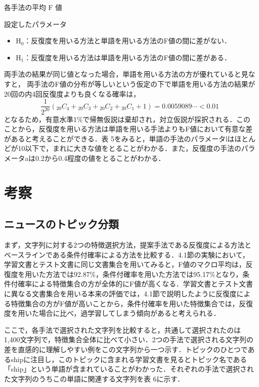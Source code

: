 \documentclass[japanese]{jnlp_1.4}
\begin{document}
\begin{table}[t]
\caption{各手法の平均 F 値}

\end{table}
\begin{table}[t]
\caption{設定したパラメータ}

\vspace{-0.5\baselineskip}
\end{table}

\begin{itemize}
\item H$_{0}$：反復度を用いる方法と単語を用いる方法のF値の間に差がない．
\item H$_{1}$：反復度を用いる方法は単語を用いる方法のF値の間に差がある．
\end{itemize}

両手法の結果が同じ値となった場合，単語を用いる方法の方が優れていると見なすと，
\pagebreak
両手法のF値の分布が等しいという仮定の下で単語を用いる方法の結果が20回の内4回反復度よりも良くなる確率は，
\[
 \frac{1}{2^{20}}({}_{20}C_{4} + {}_{20}C_{3} + {}_{20}C_{2} + {}_{20}C_{1} + 1) 
	= 0.0059089 \cdots < 0.01
\]
となるため，有意水準1{\%}で帰無仮説は棄却され，対立仮説が採択される．このことから，反復度を用いる方法は単語を用いる手法よりもF値において有意な差があると考えることができる．表 
5をみると，単語の手法のパラメータlはほとんどが10以下で，まれに大きな値をとることがわかる．また，反復度の手法のパラメータaは0.2から0.4程度の値をとることがわかる．


\section{考察}


\subsection{ニュースのトピック分類}

まず，文字列に対する2つの特徴選択方法，提案手法である反復度による方法とベースラインである条件付確率による方法を比較する．4.1節の実験において，学習文書とテスト文書に同じ文書集合を用いてみると，F値のマクロ平均は，反復度を用いた方法では92.87{\%}，条件付確率を用いた方法では95.17{\%}となり，条件付確率による特徴集合の方が全体的にF値が高くなる．学習文書とテスト文書に異なる文書集合を用いる本来の評価では，4.1節で説明したように反復度による特徴集合の方がF値が高いことから，条件付確率を用いた特徴集合では，反復度を用いた場合に比べ，過学習してしまう傾向があると考えられる． 

ここで，各手法で選択された文字列を比較すると，共通して選択されたのは1,400文字列で，特徴集合全体に比べて小さい．2つの手法で選択される文字列の差を直感的に理解しやすい例をこの文字列から一つ示す．トピックのひとつであるshipに注目し，このトピックに含まれる学習文書を見るとトピック名である「ship」という単語が含まれていることがわかった．それぞれの手法で選択された文字列のうちこの単語に関連する文字列を表 
6に示す．
\end{document}
